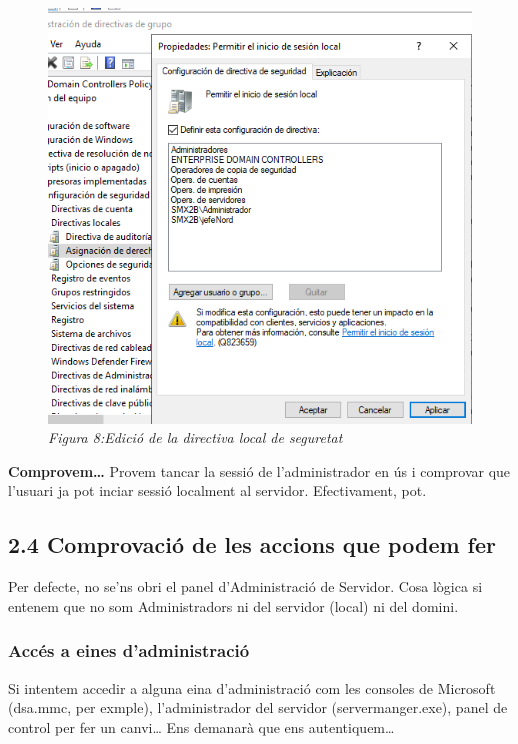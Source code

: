 \documentclass[
  a4paper,
]{article}
\begin{document}
\begin{figure}
\centering
\includegraphics{png/EditarDirectiva4.png}
\caption{\emph{Figura 8:Edició de la directiva local de seguretat}}
\end{figure}

\textbf{Comprovem\ldots{}} Provem tancar la sessió de l'administrador en
ús i comprovar que l'usuari ja pot inciar sessió localment al servidor.
Efectivament, pot.

\subsection{2.4 Comprovació de les accions que podem
fer}\label{comprovaciuxf3-de-les-accions-que-podem-fer}

Per defecte, no se'ns obri el panel d'Administració de Servidor. Cosa
lògica si entenem que no som Administradors ni del servidor (local) ni
del domini.

\subsubsection{Accés a eines
d'administració}\label{accuxe9s-a-eines-dadministraciuxf3}

Si intentem accedir a alguna eina d'administració com les consoles de
Microsoft (dsa.mmc, per exmple), l'administrador del servidor
(servermanger.exe), panel de control per fer un canvi\ldots{} Ens
demanarà que ens autentiquem\ldots{}
\end{document}
